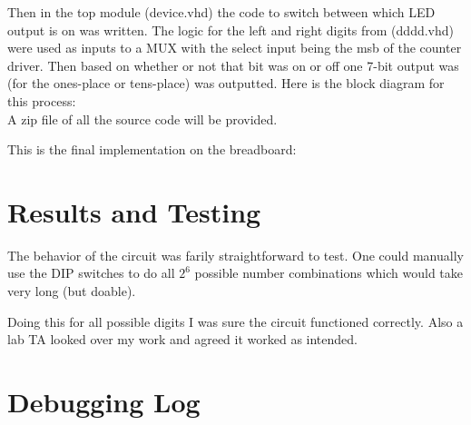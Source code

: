 \documentclass[12pt]{article}
\begin{document}
\begin{flushleft}
Then in the top module (device.vhd) the code to switch between which LED output
is on was written. The logic for the left and right digits from (dddd.vhd) were
used as inputs to a MUX with the select input being the msb of the counter
driver. Then based on whether or not that bit was on or off one 7-bit output was
(for the ones-place or tens-place) was outputted. Here is the block diagram for
this process: \\


A zip file of all the source code will be provided. 


This is the final implementation on the breadboard:\\

\section{Results and Testing}

The behavior of the circuit was farily straightforward to test. One could
manually use the DIP switches to do all $2^6$ possible number combinations which
would take very long (but doable). 

Doing this for all possible digits I was sure the circuit functioned correctly.
Also a lab TA looked over my work and agreed it worked as intended.\\


\section{Debugging Log}


\end{flushleft}
\end{document}
